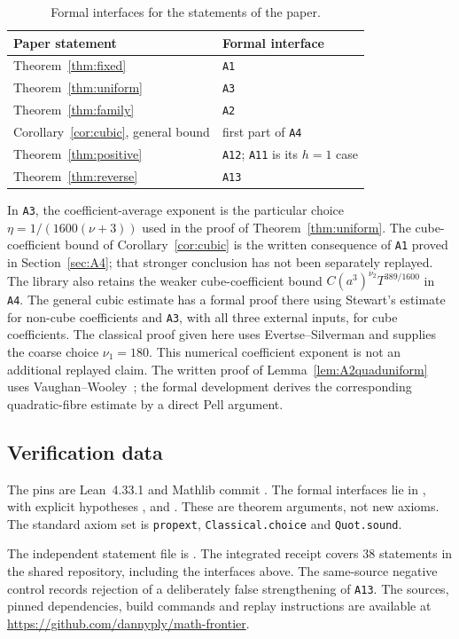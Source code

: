 \documentclass[11pt,reqno]{amsart}
\theoremstyle{definition}
\theoremstyle{remark}
\numberwithin{equation}{section}
\newcommand{\lean}{Lean}
\begin{document}
\begin{table}[!ht]
\centering\footnotesize
\begin{tabular}{@{}ll@{}}
\toprule
Paper statement & Formal interface\\\midrule
Theorem~\ref{thm:fixed} & \texttt{A1}\\
Theorem~\ref{thm:uniform} & \texttt{A3}\\
Theorem~\ref{thm:family} & \texttt{A2}\\
Corollary~\ref{cor:cubic}, general bound & first part of \texttt{A4}\\
Theorem~\ref{thm:positive} & \texttt{A12}; \texttt{A11} is its $h=1$ case\\
Theorem~\ref{thm:reverse} & \texttt{A13}\\\bottomrule
\end{tabular}
\caption{Formal interfaces for the statements of the paper.}
\end{table}

In \texttt{A3}, the coefficient-average exponent is the particular choice
$\eta=1/(1600(\nu+3))$ used in the proof of
Theorem~\ref{thm:uniform}. The cube-coefficient bound of
Corollary~\ref{cor:cubic} is the written consequence of \texttt{A1} proved
in Section~\ref{sec:A4}; that stronger conclusion has not been separately
replayed. The library also retains the weaker cube-coefficient bound
$C(a^3)^{\nu_2}T^{389/1600}$ in \texttt{A4}. The general cubic estimate
has a formal proof there using Stewart's estimate for non-cube
coefficients and \texttt{A3}, with all three external inputs, for cube
coefficients. The classical proof given here uses Evertse--Silverman and supplies the coarse choice
$\nu_1=180$. This numerical coefficient exponent is not an additional
replayed claim. The written proof of Lemma~\ref{lem:A2quaduniform}
uses Vaughan--Wooley~\cite[Lemma~3.5]{vw}; the formal development
derives the corresponding quadratic-fibre estimate by a direct Pell argument.

\subsection*{Verification data}
{\raggedright
The pins are \lean~4.33.1 and Mathlib commit
.
The formal interfaces lie in
,
with explicit hypotheses ,  and
. These are theorem arguments, not new axioms.
The standard axiom set is \texttt{propext}, \texttt{Classical.choice}
and \texttt{Quot.sound}.

The independent statement file is
.
The integrated receipt 
covers 38 statements in the shared repository, including the interfaces
above. The same-source negative control
 records rejection
of a deliberately false strengthening of \texttt{A13}.
The sources, pinned dependencies, build commands and replay instructions
are available at \url{https://github.com/dannyply/math-frontier}.
\par}
\end{document}
